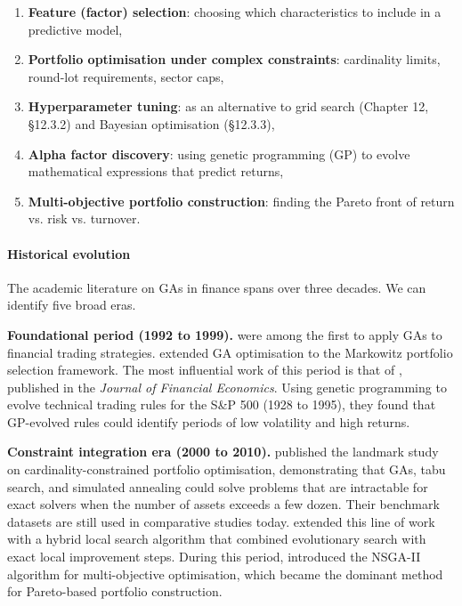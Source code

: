 \begin{enumerate}
\item \textbf{Feature (factor) selection}: choosing which characteristics to include in a predictive model,
\item \textbf{Portfolio optimisation under complex constraints}: cardinality limits, round-lot requirements, sector caps,
\item \textbf{Hyperparameter tuning}: as an alternative to grid search (Chapter 12, §12.3.2) and Bayesian optimisation (§12.3.3),
\item \textbf{Alpha factor discovery}: using genetic programming (GP) to evolve mathematical expressions that predict returns,
\item \textbf{Multi-objective portfolio construction}: finding the Pareto front of return vs. risk vs. turnover.
\end{enumerate}

\paragraph{Historical evolution}

The academic literature on GAs in finance spans over three decades. We can identify five broad eras.

\textbf{Foundational period (1992 to 1999).} \cite{Bauer1992} were among the first to apply GAs to financial trading strategies. \cite{Arnone1993} extended GA optimisation to the Markowitz portfolio selection framework. The most influential work of this period is that of \cite{Allen1999}, published in the \textit{Journal of Financial Economics}. Using genetic programming to evolve technical trading rules for the S\&P 500 (1928 to 1995), they found that GP-evolved rules could identify periods of low volatility and high returns.

\textbf{Constraint integration era (2000 to 2010).} \cite{Chang2000} published the landmark study on cardinality-constrained portfolio optimisation, demonstrating that GAs, tabu search, and simulated annealing could solve problems that are intractable for exact solvers when the number of assets exceeds a few dozen. Their benchmark datasets are still used in comparative studies today. \cite{Maringer2003} extended this line of work with a hybrid local search algorithm that combined evolutionary search with exact local improvement steps. During this period, \cite{Deb2002} introduced the NSGA-II algorithm for multi-objective optimisation, which became the dominant method for Pareto-based portfolio construction.

